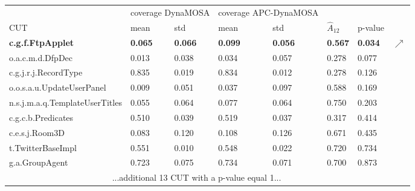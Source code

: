 \begin{tabular}{llllllll}
\hline
\multicolumn{1}{l|}{}                               & \multicolumn{2}{l|}{coverage DynaMOSA} & \multicolumn{2}{l|}{coverage APC-DynaMOSA} &                                  &         \\
\multicolumn{1}{l|}{CUT}                            & mean    & \multicolumn{1}{l|}{std}     & mean    & \multicolumn{1}{l|}{std}    & $\hat{A}_{12}$ & p-value & \\ \hline
\multicolumn{1}{l|}{\textbf{c.g.f.FtpApplet}}       & \textbf{0.065} & \multicolumn{1}{l|}{\textbf{0.066}} & \textbf{0.099} & \multicolumn{1}{l|}{\textbf{0.056}} & \textbf{0.567}                   & \textbf{0.034} & $\nearrow$\\
\multicolumn{1}{l|}{o.a.c.m.d.DfpDec}               & 0.013   & \multicolumn{1}{l|}{0.038}   & 0.034   & \multicolumn{1}{l|}{0.057}  & 0.278                            & 0.077  &  \\
\multicolumn{1}{l|}{c.g.j.r.j.RecordType}           & 0.835   & \multicolumn{1}{l|}{0.019}   & 0.834   & \multicolumn{1}{l|}{0.012}  & 0.278                            & 0.126  &  \\
\multicolumn{1}{l|}{o.o.s.a.u.UpdateUserPanel}      & 0.009   & \multicolumn{1}{l|}{0.051}   & 0.037   & \multicolumn{1}{l|}{0.097}  & 0.588                            & 0.169  &  \\
\multicolumn{1}{l|}{n.s.j.m.a.q.TemplateUserTitles} & 0.055   & \multicolumn{1}{l|}{0.064}   & 0.077   & \multicolumn{1}{l|}{0.064}  & 0.750                            & 0.203  &  \\
\multicolumn{1}{l|}{c.g.c.b.Predicates}             & 0.510   & \multicolumn{1}{l|}{0.039}   & 0.519   & \multicolumn{1}{l|}{0.037}  & 0.317                            & 0.414  &  \\
\multicolumn{1}{l|}{c.e.s.j.Room3D}                 & 0.083   & \multicolumn{1}{l|}{0.120}   & 0.108   & \multicolumn{1}{l|}{0.126}  & 0.671                            & 0.435  &  \\
\multicolumn{1}{l|}{t.TwitterBaseImpl}              & 0.551   & \multicolumn{1}{l|}{0.010}   & 0.548   & \multicolumn{1}{l|}{0.022}  & 0.720                            & 0.734  &  \\
\multicolumn{1}{l|}{g.a.GroupAgent}                 & 0.723   & \multicolumn{1}{l|}{0.075}   & 0.734   & \multicolumn{1}{l|}{0.071}  & 0.700                            & 0.873  &  \\
\multicolumn{7}{c}{...additional 13 CUT with a p-value equal 1...}                                                                                                                  \\ \hline
\end{tabular}